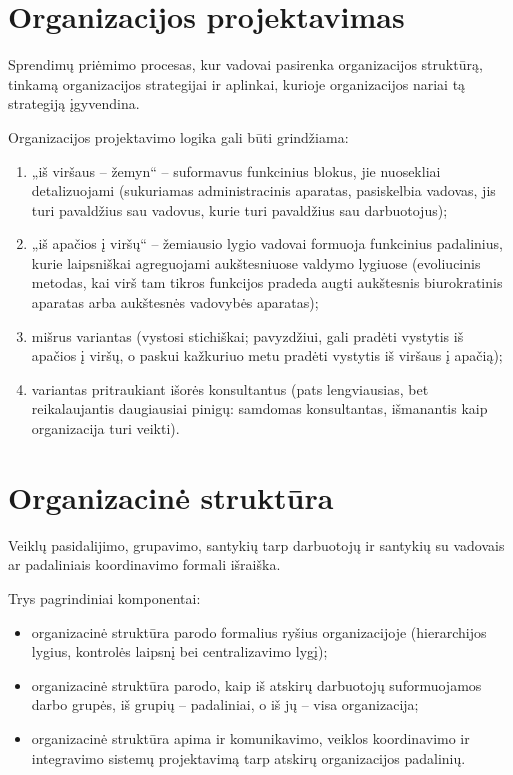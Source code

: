 \section{Organizacijos projektavimas}

\begin{defn}
  Sprendimų priėmimo procesas, kur vadovai pasirenka organizacijos
  struktūrą, tinkamą organizacijos strategijai ir aplinkai, kurioje
  organizacijos nariai tą strategiją įgyvendina.
\end{defn}

Organizacijos projektavimo logika gali būti grindžiama:
\begin{enumerate}
  \item „iš viršaus – žemyn“ – suformavus funkcinius blokus, jie
    nuosekliai detalizuojami (sukuriamas administracinis aparatas,
    pasiskelbia vadovas, jis turi pavaldžius sau vadovus, kurie
    turi pavaldžius sau darbuotojus);
  \item „iš apačios į viršų“ – žemiausio lygio vadovai formuoja
    funkcinius padalinius, kurie laipsniškai agreguojami aukštesniuose
    valdymo lygiuose (evoliucinis metodas, kai virš tam tikros funkcijos
    pradeda augti aukštesnis biurokratinis aparatas arba aukštesnės
    vadovybės aparatas);
  \item mišrus variantas (vystosi stichiškai; pavyzdžiui, gali pradėti
    vystytis iš apačios į viršų, o paskui kažkuriuo metu pradėti vystytis
    iš viršaus į apačią);
  \item variantas pritraukiant išorės konsultantus (pats lengviausias,
    bet reikalaujantis daugiausiai pinigų: samdomas konsultantas, 
    išmanantis kaip organizacija turi veikti).
\end{enumerate}

\section{Organizacinė struktūra}

\begin{defn}
  Veiklų pasidalijimo, grupavimo, santykių tarp darbuotojų ir santykių
  su vadovais ar padaliniais koordinavimo formali išraiška.
\end{defn}

Trys pagrindiniai komponentai:
\begin{itemize}
  \item organizacinė struktūra parodo formalius ryšius organizacijoje
    (hierarchijos lygius, kontrolės laipsnį bei centralizavimo lygį);
  \item organizacinė struktūra parodo, kaip iš atskirų darbuotojų
    suformuojamos darbo grupės, iš grupių – padaliniai, o iš jų –
    visa organizacija;
  \item organizacinė struktūra apima ir komunikavimo, veiklos
    koordinavimo ir integravimo sistemų projektavimą tarp atskirų
    organizacijos padalinių.
\end{itemize}

